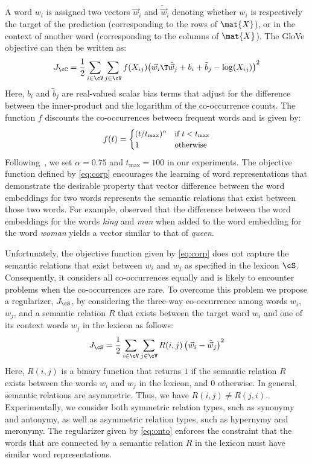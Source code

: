 \documentclass[letterpaper]{article}
\newcommand{\citet}[1]{\citeauthor{#1} \shortcite{#1}}
\begin{document}
A word $w_i$ is assigned two vectors $\vec{w}_i$ and $\tilde{\vec{w}}_i$ denoting whether $w_i$ is respectively
the target of the prediction  (corresponding to the rows of $\mat{X}$),
or in the context of another word (corresponding to the columns of $\mat{X}$).
The GloVe objective can then be written as:
\begin{equation}
\small
\label{eq:corp}
J_{\cC} = \frac{1}{2} \sum_{i \in \cV} \sum_{j \in \cV} f(X_{ij}) {\left(\vec{w}_i\T\tilde{\vec{w}}_j +b_i + \tilde{b}_j  - \log(X_{ij}) \right)}^2
\end{equation}
Here, $b_i$ and $\tilde{b}_j$ are real-valued scalar bias terms that adjust for
the difference between the inner-product and the logarithm of
the co-occurrence counts.
The function $f$ discounts the co-occurrences between frequent words and is given by:
\begin{equation}
\small
f(t) = \begin{cases} (t/t_{\max})^\alpha & \text{if $t < t_{\max}$} \\
1 & \text{otherwise}
\end{cases}
\end{equation}
Following~\cite{Pennington:EMNLP:2014}, we set $\alpha = 0.75$ and $t_{\max} = 100$ in our experiments.
The objective function defined by \eqref{eq:corp} encourages the learning of word representations that demonstrate the
desirable property that vector difference between the word embeddings for two words represents the semantic relations
that exist between those two words. For example, \citet{Mikolov:NAACL:2013} observed that
the difference between the word embeddings for the words \emph{king} and \emph{man} when added to the word embedding
for the word \emph{woman} yields a vector similar to that of \emph{queen}.

Unfortunately, the objective function given by \eqref{eq:corp} does not capture the semantic relations that exist between $w_i$ and $w_j$
as specified in the lexicon $\cS$. Consequently, it considers all co-occurrences equally and is likely to encounter problems when the
co-occurrences are rare.
To overcome this problem we propose a regularizer, $J_{\cS}$,  by considering the three-way co-occurrence
among words $w_i$, $w_j$, and a semantic relation $R$ that exists between the target word $w_i$ and
one of its context words $w_j$ in the lexicon as follows:
\begin{equation}
\small
\label{eq:onto}
J_{\cS} = \frac{1}{2} \sum_{i \in \cV}  \sum_{j \in \cV} R(i,j) \left(\vec{w}_i - \tilde{\vec{w}}_j \right)^2
\end{equation}
Here, $R(i,j)$ is a binary function that returns $1$ if  the semantic relation $R$ exists between the words $w_i$ and $w_j$
in the lexicon, and $0$ otherwise.
In general, semantic relations are asymmetric. Thus, we have $R(i,j) \neq R(j,i)$.
Experimentally, we consider both symmetric relation types, such as synonymy and antonymy, as well as
asymmetric relation types, such as hypernymy and meronymy.
The regularizer given by \eqref{eq:onto} enforces the constraint that the words that are connected by a semantic relation $R$ in the
lexicon must have similar word representations.
\end{document}
